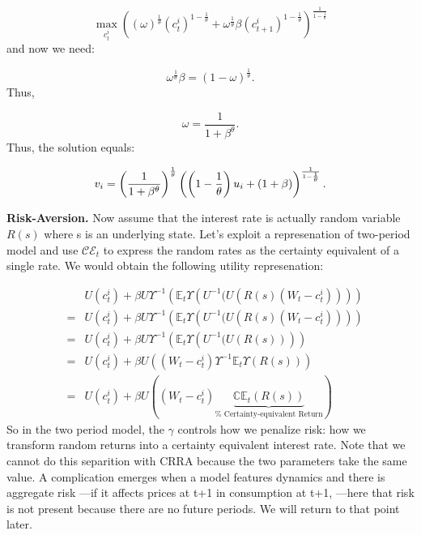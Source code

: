 \documentclass{article}
\begin{document}
\begin{equation*}
\max_{c_{t}^{i}}\left( \left( \omega \right) ^{\frac{1}{\theta }}\left(
c_{t}^{i}\right) ^{1-\frac{1}{\theta }}+\omega ^{\frac{1}{\theta }}\beta
\left( c_{t+1}^{i}\right) ^{1-\frac{1}{\theta }}\right) ^{\frac{1}{1-\frac{1%
}{\theta }}}
\end{equation*}%
and now we need:

\begin{equation*}
\omega ^{\frac{1}{\theta }}\beta =\left( 1-\omega \right) ^{\frac{1}{\theta }%
}.
\end{equation*}%
Thus,

\begin{equation*}
\omega =\frac{1}{1+\beta ^{\theta }}.
\end{equation*}%
Thus, the solution equals:

\begin{equation*}
v_{i}=\left( \frac{1}{1+\beta ^{\theta }}\right) ^{\frac{1}{\theta }}\left(
\left( 1-\frac{1}{\theta }\right) u_{i}+\left( 1+\beta \right) \right) ^{%
\frac{1}{1-\frac{1}{\theta }}}.
\end{equation*}

\textbf{Risk-Aversion.} Now assume that the interest rate is actually random
variable $R\left( s\right) $ where s is an underlying state. Let's exploit a
represenation of two-period model and use $\mathcal{CE}_{t}$ to express the
random rates as the certainty equivalent of a single rate. We would obtain
the following utility represenation:

\begin{eqnarray*}
&&U\left( c_{t}^{i}\right) +\beta U\Upsilon ^{-1}\left( \mathbb{E}%
_{t}\Upsilon \left( U^{-1}(U\left( R\left( s\right) \left(
W_{t}-c_{t}^{i}\right) \right) \right) \right) \\
&=&U\left( c_{t}^{i}\right) +\beta U\Upsilon ^{-1}\left( \mathbb{E}%
_{t}\Upsilon \left( U^{-1}(U\left( R\left( s\right) \left(
W_{t}-c_{t}^{i}\right) \right) \right) \right) \\
&=&U\left( c_{t}^{i}\right) +\beta U\Upsilon ^{-1}\left( \mathbb{E}%
_{t}\Upsilon \left( U^{-1}(U\left( R\left( s\right) \right) \right) \right)
\\
&=&U\left( c_{t}^{i}\right) +\beta U\left( \left( W_{t}-c_{t}^{i}\right)
\Upsilon ^{-1}\mathbb{E}_{t}\Upsilon \left( R\left( s\right) \right) \right)
\\
&=&U\left( c_{t}^{i}\right) +\beta U\left( \left( W_{t}-c_{t}^{i}\right)
\underbrace{\mathbb{CE}_{t}\left( R\left( s\right) \right) }_{\text{%
Certainty-equivalent Return}}\right)
\end{eqnarray*}%
So in the two period model, the $\gamma $ controls how we penalize risk: how
we transform random returns into a certainty equivalent interest rate. Note
that we cannot do this separition with CRRA because the two parameters take
the same value. A complication emerges when a model features dynamics and
there is aggregate risk ---if it affects prices at t+1 in consumption at
t+1, ---here that risk is not present because there are no future periods.
We will return to that point later.
\end{document}
